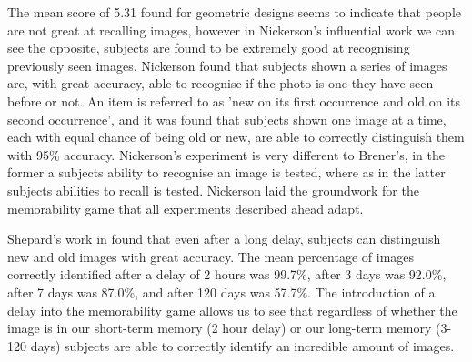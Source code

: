 \documentclass{UoYCSproject}
\begin{document}

The mean score of 5.31 found for geometric designs seems to indicate that people are not great at recalling images, however in Nickerson's influential work \cite{NickersonShortTermMemory} we can see the opposite, subjects are found to be extremely good at recognising previously seen images. Nickerson found that subjects shown a series of images are, with great accuracy, able to recognise if the photo is one they have seen before or not. An item is referred to as 'new on its first occurrence and old on its second occurrence'\cite[p.156]{NickersonShortTermMemory}, and it was found that subjects shown one image at a time, each with equal chance of being old or new, are able to correctly distinguish them with 95\% accuracy. Nickerson's experiment is very different to Brener's, in the former a subjects ability to recognise an image is tested, where as in the latter subjects abilities to recall is tested. Nickerson laid the groundwork for the memorability game that all experiments described ahead adapt.  

Shepard's work in \cite{ShepardRecognition} found that even after a long delay, subjects can distinguish new and old images with great accuracy. The mean percentage of images correctly identified after a delay of 2 hours was 99.7\%, after 3 days was 92.0\%, after 7 days was 87.0\%, and after 120 days was 57.7\%. The introduction of a delay into the memorability game allows us to see that regardless of whether the image is in our short-term memory (2 hour delay) or our long-term memory (3-120 days) subjects are able to correctly identify an incredible amount of images.
\end{document}
